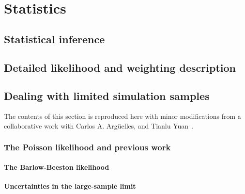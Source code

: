 \chapter{Statistics}\label{chapter:statistics}
\section{Statistical inference\label{sec:statistics}}
\begingroup
\graphicspath{{results/HESE_Final_Paper/}}

\endgroup

\section{Detailed likelihood and weighting description\label{sec:likelihood}}
\begingroup
\graphicspath{{results/HESE_Final_Paper/}}

\endgroup

\section{Dealing with limited simulation samples\label{sec:limited_simulation}}
The contents of this section is reproduced here with minor modifications from a collaborative work with Carlos A. Argüelles, and Tianlu Yuan~\cite{Arguelles:2019izp}.

\begingroup
\graphicspath{{results/mcllh_paper/}}

\endgroup

\subsection{The Poisson likelihood and previous work\label{sec:mc_intro}}
\begingroup
\graphicspath{{results/mcllh_paper/}}

\endgroup

\subsubsection{The Barlow-Beeston likelihood}
\begingroup
\graphicspath{{results/mcllh_paper/}}

\endgroup

\subsubsection{Uncertainties in the large-sample limit}
\begingroup
\graphicspath{{results/mcllh_paper/}}

\endgroup

